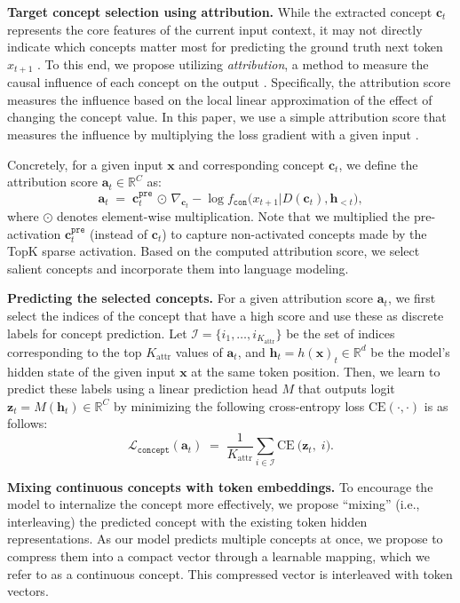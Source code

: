 \documentclass[]{fairmeta}
\def\rva{{\mathbf{a}}}
\def\rvc{{\mathbf{c}}}
\def\rvh{{\mathbf{h}}}
\def\rvx{{\mathbf{x}}}
\def\rvz{{\mathbf{z}}}
\begin{document}
\textbf{Target concept selection using attribution.}
While the extracted concept $\rvc_t$ represents the core features of the current input context, it may not directly indicate which concepts matter most for predicting the ground truth next token $x_{t+1}$  \citep{templeton2024scaling}. To this end, we propose utilizing \emph{attribution}, a method to measure the causal influence of each concept on the output \citep{baehrens2010explain,sundararajan2017axiomatic}. Specifically, the attribution score measures the influence based on the local linear approximation of the effect of changing the concept value. In this paper, we use a simple attribution score that measures the influence by multiplying the loss gradient with a given input \citep{simonyan2014very,shrikumar2016not}.

Concretely, for a given input $\rvx$ and corresponding concept $\rvc_t$, we define the attribution score $\rva_t\in\mathbb{R}^{C}$ as:
\begin{equation}
\rva_t \;=\; 
\rvc_t^{\mathtt{pre}} \,\odot\, \nabla_{\rvc_t} -\log f_{\mathtt{con}}\big(x_{t+1}|D(\rvc_{t}),\rvh_{<t}\big),
\end{equation}
where $\odot$ denotes element-wise multiplication. Note that we multiplied the pre-activation $\rvc_t^{\mathtt{pre}}$ (instead of $\rvc_t$) to capture non-activated concepts made by the TopK sparse activation. Based on the computed attribution score, we select salient concepts and incorporate them into language modeling.

\textbf{Predicting the selected concepts.} 
For a given attribution score $\rva_t$, we first select the indices of the concept that have a high score and use these as discrete labels for concept prediction. Let $\mathcal{I}=\{i_1,\ldots,i_{K_{\text{attr}}}\}$ be the set of indices corresponding to the top $K_{\text{attr}}$ values of $\rva_t$, and $\rvh_t=h(\rvx)_{t} \in \mathbb{R}^{d}$ be the model’s hidden state of the given input $\rvx$ at the same token position. Then, we learn to predict these labels using a linear prediction head $M$ that outputs logit $\rvz_t=M(\rvh_t) \in \mathbb{R}^{C}$ by minimizing the following cross-entropy loss $\mathrm{CE}(\cdot, \cdot)$ is as follows:
\begin{equation}
    \mathcal{L}_{\mathtt{concept}}(\rva_t) 
    \;=\;
    \frac{1}{K_{\text{attr}}}\sum_{i \in \mathcal{I}} \mathrm{CE}~\!\bigl(\rvz_t,\; i\bigr).
    \label{eq:concept_pred}
\end{equation}

\textbf{Mixing continuous concepts with token embeddings.}
To encourage the model to internalize the concept more effectively, we propose ``mixing'' (i.e., interleaving) the predicted concept with the existing token hidden representations. As our model predicts multiple concepts at once, we propose to compress them into a compact vector through a learnable mapping, which we refer to as a continuous concept. This compressed vector is interleaved with token vectors.
\end{document}
